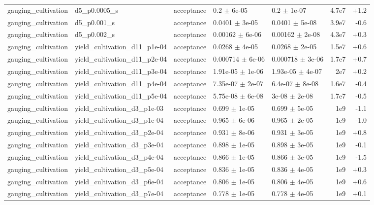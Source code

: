 \documentclass[10pt]{article}
\begin{document}
{\begin{longtable}{l l l l l r r}
gauging\_cultivation & d5\_p0.0005\_s & acceptance & 0.2 $\pm$ 6e-05 & 0.2 $\pm$ 1e-07 & 4.7e7 & +1.2 \\
gauging\_cultivation & d5\_p0.001\_s & acceptance & 0.0401 $\pm$ 3e-05 & 0.0401 $\pm$ 5e-08 & 3.9e7 & -0.6 \\
gauging\_cultivation & d5\_p0.002\_s & acceptance & 0.00162 $\pm$ 6e-06 & 0.00162 $\pm$ 2e-08 & 4.3e7 & +0.3 \\
gauging\_cultivation & yield\_cultivation\_d11\_p1e-04 & acceptance & 0.0268 $\pm$ 4e-05 & 0.0268 $\pm$ 2e-05 & 1.5e7 & +0.6 \\
gauging\_cultivation & yield\_cultivation\_d11\_p2e-04 & acceptance & 0.000714 $\pm$ 6e-06 & 0.000718 $\pm$ 3e-06 & 1.7e7 & +0.7 \\
gauging\_cultivation & yield\_cultivation\_d11\_p3e-04 & acceptance & 1.91e-05 $\pm$ 1e-06 & 1.93e-05 $\pm$ 4e-07 & 2e7 & +0.2 \\
gauging\_cultivation & yield\_cultivation\_d11\_p4e-04 & acceptance & 7.35e-07 $\pm$ 2e-07 & 6.4e-07 $\pm$ 8e-08 & 1.6e7 & -0.4 \\
gauging\_cultivation & yield\_cultivation\_d11\_p5e-04 & acceptance & 5.75e-08 $\pm$ 6e-08 & 3e-08 $\pm$ 2e-08 & 1.7e7 & -0.5 \\
gauging\_cultivation & yield\_cultivation\_d3\_p1e-03 & acceptance & 0.699 $\pm$ 1e-05 & 0.699 $\pm$ 5e-05 & 1e9 & -1.1 \\
gauging\_cultivation & yield\_cultivation\_d3\_p1e-04 & acceptance & 0.965 $\pm$ 6e-06 & 0.965 $\pm$ 2e-05 & 1e9 & -1.0 \\
gauging\_cultivation & yield\_cultivation\_d3\_p2e-04 & acceptance & 0.931 $\pm$ 8e-06 & 0.931 $\pm$ 3e-05 & 1e9 & +0.8 \\
gauging\_cultivation & yield\_cultivation\_d3\_p3e-04 & acceptance & 0.898 $\pm$ 1e-05 & 0.898 $\pm$ 3e-05 & 1e9 & -0.1 \\
gauging\_cultivation & yield\_cultivation\_d3\_p4e-04 & acceptance & 0.866 $\pm$ 1e-05 & 0.866 $\pm$ 3e-05 & 1e9 & -1.5 \\
gauging\_cultivation & yield\_cultivation\_d3\_p5e-04 & acceptance & 0.836 $\pm$ 1e-05 & 0.836 $\pm$ 4e-05 & 1e9 & +0.3 \\
gauging\_cultivation & yield\_cultivation\_d3\_p6e-04 & acceptance & 0.806 $\pm$ 1e-05 & 0.806 $\pm$ 4e-05 & 1e9 & +0.6 \\
gauging\_cultivation & yield\_cultivation\_d3\_p7e-04 & acceptance & 0.778 $\pm$ 1e-05 & 0.778 $\pm$ 4e-05 & 1e9 & +0.1 \\

\end{longtable}}
\end{document}
